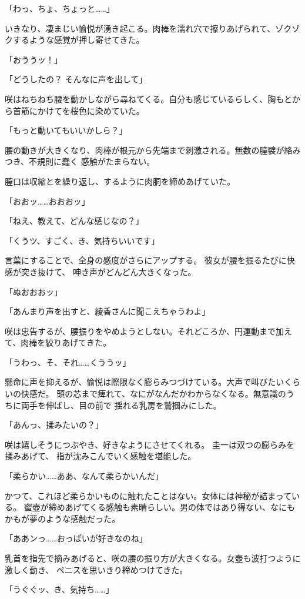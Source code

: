 ﻿\documentclass[
    book,tate,
    line_length=30zw,
    jafontsize=12pt,
    paper=b5j,
    landscape,
    ]{jlreq}
\begin{document}
「わっ、ちょ、ちょっと……」

いきなり、凄まじい愉悦が湧き起こる。肉棒を濡れ穴で擦りあげられて、ゾクゾクするような感覚が押し寄せてきた。

「おううッ！」

「どうしたの？ そんなに声を出して」

咲はねちねち腰を動かしながら尋ねてくる。自分も感じているらしく、胸もとから首筋にかけてを桜色に染めていた。

「もっと動いてもいいかしら？」

腰の動きが大きくなり、肉棒が根元から先端まで刺激される。無数の膣襞が絡みつき、不規則に蠢く
感触がたまらない。

膣口は収縮とを繰り返し、するように肉胴を締めあげていた。

「おおッ……おおおッ」

「ねえ、教えて、どんな感じなの？」

「くうツ、すごく、き、気持ちいいです」

言葉にすることで、全身の感度がさらにアップする。 彼女が腰を振るたびに快感が突き抜けて、
呻き声がどんどん大きくなった。

「ぬおおおッ」

「あんまり声を出すと、綾香さんに聞こえちゃうわよ」

咲は忠告するが、腰振りをやめようとしない。それどころか、円運動まで加えて、肉棒を絞りあげてきた。

「うわっ、そ、それ……くううッ」

懸命に声を抑えるが、愉悦は際限なく膨らみつづけている。大声で叫びたいくらいの快感だ。
頭の芯まで痺れて、なにがなんだかわからなくなる。無意識のうちに両手を伸ばし、目の前で
揺れる乳房を鷲摑みにした。

「あんっ、揉みたいの？」

咲は嬉しそうにつぶやき、好きなようにさせてくれる。 圭一は双つの膨らみを揉みあげて、
指が沈みこんでいく感触を堪能した。

「柔らかい……ああ、なんて柔らかいんだ」

かつて、これほど柔らかいものに触れたことはない。女体には神秘が詰まっている。
蜜壺が締めあげてくる感触も素晴らしい。男の体ではあり得ない、なにもかもが夢のような感触だった。

「ああンっ……おっぱいが好きなのね」

乳首を指先で摘みあげると、咲の腰の振り方が大きくなる。女壺も波打つように激しく動き、
ペニスを思いきり締めつけてきた。

「うぐぐッ、き、気持ち……」
\end{document}
